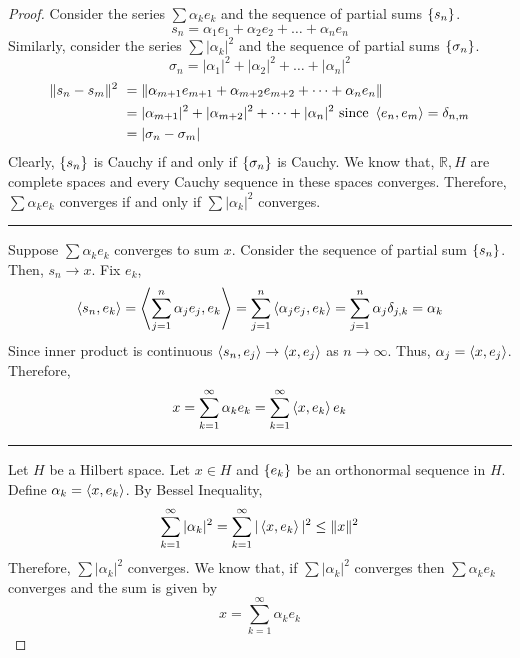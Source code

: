 \begin{proof}
	Consider the series $\sum \alpha_k e_k$ and the sequence of partial sums $\left\{s_n\right\}$.
	\[ s_n = \alpha_1 e_1 + \alpha_2 e_2 + \dots + \alpha_n e_n \]
	Similarly, consider the series $\sum |\alpha_k|^2$ and the sequence of partial sums $\left\{\sigma_n\right\}$.
	\[ \sigma_n = |\alpha_1|^2 + |\alpha_2|^2 + \dots + |\alpha_n|^2 \]
	\begin{align*}
		\|s_n - s_m\|^2 \
		& = \| \alpha_{m+1}e_{m+1} + \alpha_{m+2} e_{m+2} + \dots + \alpha_n e_n \| \\
		& = |\alpha_{m+1}|^2 + |\alpha_{m+2}|^2 + \dots + |\alpha_n|^2 \text{ since } \left\langle e_n,e_m \right\rangle = \delta_{n,m} \\
		& = |\sigma_n-\sigma_m|
	\end{align*}
	Clearly, $\left\{s_n\right\}$ is Cauchy if and only if $\left\{\sigma_n\right\}$ is Cauchy.
	We know that, $\mathbb{R},H$ are complete spaces and every Cauchy sequence in these spaces converges.
	Therefore, $\sum \alpha_k e_k$ converges if and only if $\sum |\alpha_k|^2$ converges.\\

	\hrule \vspace{1em}

	Suppose $\sum \alpha_k e_k$ converges to sum $x$.
	Consider the sequence of partial sum $\left\{s_n\right\}$.
	Then, $s_n \to x$.
	Fix $e_k$,
	\[ \left\langle s_n,e_k \right\rangle = \left\langle \sum_{j=1}^n \alpha_j e_j,e_k \right\rangle = \sum_{j=1}^n \left\langle \alpha_j e_j,e_k \right\rangle = \sum_{j=1}^n \alpha_j \delta_{j,k} = \alpha_k \]
	Since inner product is continuous $\left\langle s_n,e_j \right\rangle \to \left\langle x,e_j \right\rangle$ as $n \to \infty$.
	Thus, $\alpha_j = \left\langle x,e_j \right\rangle$.
	Therefore, 
	\[ x = \sum_{k=1}^\infty \alpha_k e_k = \sum_{k=1}^\infty \left\langle x,e_k \right\rangle e_k \]

	\hrule \vspace{1em}

	Let $H$ be a Hilbert space.
	Let $x \in H$ and $\left\{e_k\right\}$ be an orthonormal sequence in $H$.
	Define $\alpha_k = \left\langle x,e_k \right\rangle$.
	By Bessel Inequality,
	\[ \sum_{k=1}^\infty |\alpha_k|^2 = \sum_{k=1}^\infty |\left\langle x,e_k \right\rangle|^2 \le \|x\|^2 \]
	Therefore, $\sum |\alpha_k|^2$ converges.
	We know that, if $\sum |\alpha_k|^2$ converges then $\sum \alpha_k e_k$ converges and the sum is given by
	\[ x = \sum_{k=1}^\infty \alpha_k e_k \]
\end{proof}

